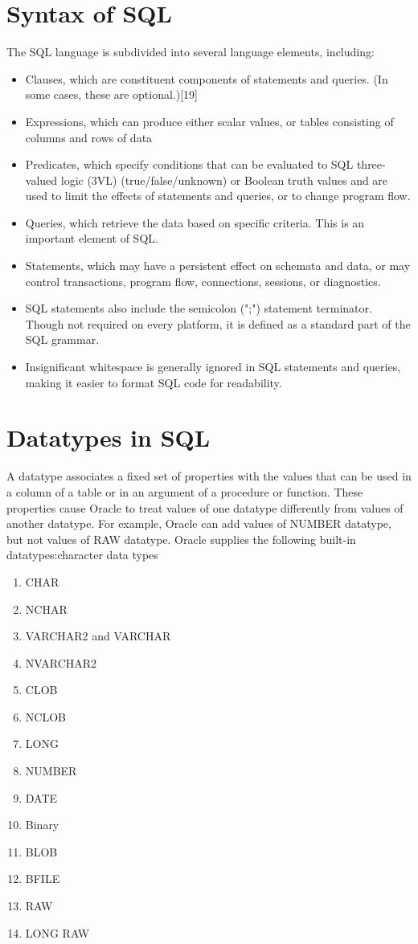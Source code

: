 \documentclass[10pt,a4paper,titlepage]{report}
\begin{document}
{\chapter{Syntax of SQL}

The SQL language is subdivided into several language elements, including:
\begin{itemize}
	\item Clauses, which are constituent components of statements and queries. (In some cases, these are optional.)[19]
	\item Expressions, which can produce either scalar values, or tables consisting of columns and rows of data
	\item Predicates, which specify conditions that can be evaluated to SQL three-valued logic (3VL) (true/false/unknown) or Boolean truth values and are used to limit the effects of statements and queries, or to change program flow.
	\item Queries, which retrieve the data based on specific criteria. This is an important element of SQL.
	\item Statements, which may have a persistent effect on schemata and data, or may control transactions, program flow, connections, sessions, or diagnostics.
	\item SQL statements also include the semicolon (";") statement terminator. Though not required on every platform, it is defined as a standard part of the SQL grammar.
	\item Insignificant whitespace is generally ignored in SQL statements and queries, making it easier to format SQL code for readability.
\end{itemize}

\chapter{Datatypes in SQL}

A datatype associates a fixed set of properties with the values that can be used in a column of a table
or in an argument of a procedure or function. These properties cause Oracle to treat values of one
datatype differently from values of another datatype. For example, Oracle can add values of
NUMBER datatype, but not values of RAW datatype.
Oracle supplies the following built-in datatypes:character data types
\begin{enumerate}
	\item CHAR
	\item NCHAR
	\item VARCHAR2 and VARCHAR
	\item NVARCHAR2
	\item CLOB
	\item NCLOB
	\item LONG
	\item NUMBER
	\item DATE
	\item Binary
	\item BLOB
	\item BFILE
	\item RAW
	\item LONG RAW
\end{enumerate}



}
\end{document}
